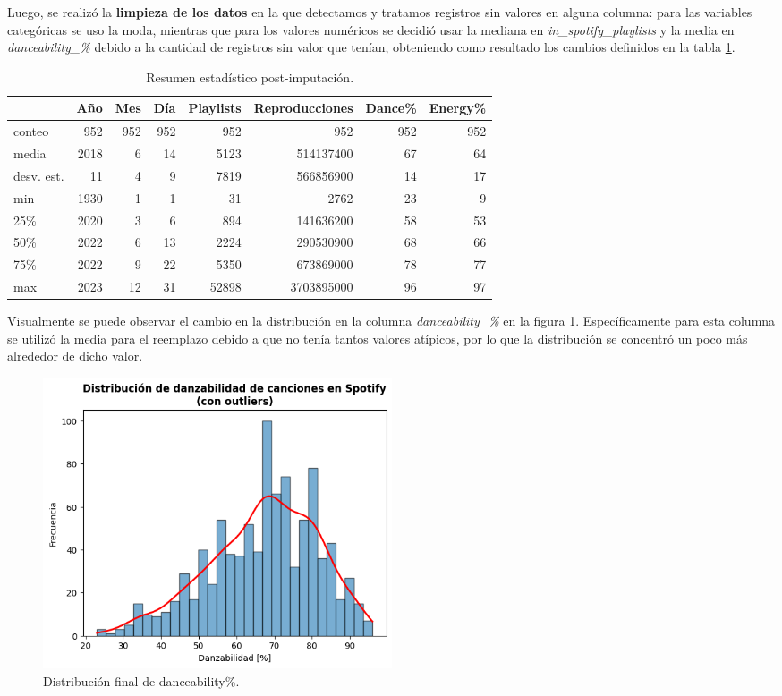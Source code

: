 \documentclass{article}
\begin{document}
	Luego, se realizó la \textbf{limpieza de los datos} en la que detectamos y tratamos registros sin valores en alguna columna: para las variables categóricas se uso la moda, mientras que para los valores numéricos se decidió usar la mediana en \textit{in\_spotify\_playlists} y la media en \textit{danceability\_\%} debido a la cantidad de registros sin valor que tenían, obteniendo como resultado los cambios definidos en la tabla \ref{tab:post-imp}.
	
	\begin{table}[ht]
		\centering
		\begin{tabular}{lrrrrrrr}
			\hline
			& Año & Mes & Día & Playlists & Reproducciones & Dance\% & Energy\% \\
			\hline
			conteo & 952 & 952 & 952 & 952 & 952 & 952 & 952 \\
			media & 2018 & 6 & 14 & 5123 & 514137400 & 67 & 64 \\
			desv. est. & 11 & 4 & 9 & 7819 & 566856900 & 14 & 17 \\
			min & 1930 & 1 & 1 & 31 & 2762 & 23 & 9 \\
			25\% & 2020 & 3 & 6 & 894 & 141636200 & 58 & 53 \\
			50\% & 2022 & 6 & 13 & 2224 & 290530900 & 68 & 66 \\
			75\% & 2022 & 9 & 22 & 5350 & 673869000 & 78 & 77 \\
			max & 2023 & 12 & 31 & 52898 & 3703895000 & 96 & 97 \\
			\hline
		\end{tabular}
		\caption{Resumen estadístico post-imputación.}
		\label{tab:post-imp}
	\end{table}
	
	Visualmente se puede observar el cambio en la distribución en la columna \textit{danceability\_\%} en la figura \ref{fig:dance_post}. Específicamente para esta columna se utilizó la media para el reemplazo debido a que no tenía tantos valores atípicos, por lo que la distribución se concentró un poco más alrededor de dicho valor.
	
	\newpage
	\begin{figure}[h!] 
		\centering
		\includegraphics[width=0.5\textwidth]{./danceability_after.png}
		\caption{Distribución final de danceability\%.}
		\label{fig:dance_post}
	\end{figure}
	
\end{document}
